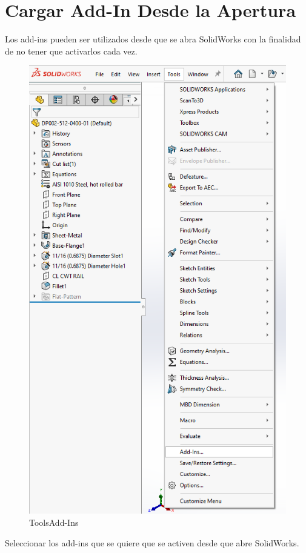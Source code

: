 \documentclass[12pt,letterpaper,final]{report}
\begin{document}
\chapter{Cargar Add-In Desde la Apertura}

Los add-ins pueden ser utilizados desde que se abra SolidWorks con la finalidad de no tener que activarlos cada vez.

\begin{figure}[H]
	\centering
	\includegraphics[width=0.85\linewidth, height=0.55\textheight,keepaspectratio]{Imagenes/solidworks_addin_01}
	\caption{Tools\textrightarrow Add-Ins}
	\label{fig:solidworksaddin01}
\end{figure}

Seleccionar los add-ins que se quiere que se activen desde que abre SolidWorks.
\end{document}
